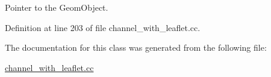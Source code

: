 Pointer to the Geom\+Object. 



Definition at line 203 of file channel\+\_\+with\+\_\+leaflet.\+cc.



The documentation for this class was generated from the following file\+:\begin{DoxyCompactItemize}
\item 
\hyperlink{channel__with__leaflet_8cc}{channel\+\_\+with\+\_\+leaflet.\+cc}\end{DoxyCompactItemize}
